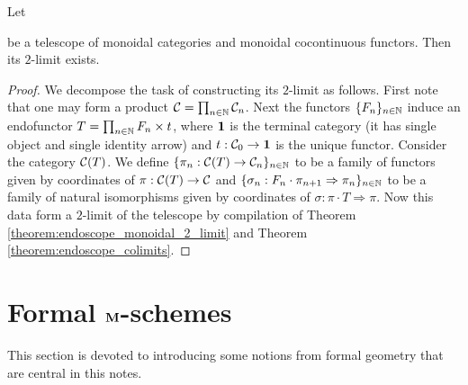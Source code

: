 \begin{corollary}\label{corollary:telescope_2_limits}
Let 
\begin{center}   
\end{center}
be a telescope of monoidal categories and monoidal cocontinuous functors. Then its $2$-limit exists.
\end{corollary}
\begin{proof}
We decompose the task of constructing its $2$-limit as follows. First note that one may form a product ${\mathcal C} = \prod_{n\in {\mathbb N}}{\mathcal C}_n$. Next the functors $\{F_n\}_{n\in {\mathbb N}}$ induce an endofunctor $T = \prod_{n\in {\mathbb N}}F_n\times t$, where $\mathbf{1}$ is the terminal category (it has single object and single identity arrow) and $t:{\mathcal C}_0\rightarrow \mathbf{1}$ is the unique functor. Consider the category ${\mathcal C}(T)$. We define $\{\pi_n:{\mathcal C}(T)\rightarrow {\mathcal C}_n\}_{n\in {\mathbb N}}$ to be a family of functors given by coordinates of $\pi:{\mathcal C}(T)\rightarrow {\mathcal C}$ and $\{\sigma_n:F_n\cdot \pi_{n+1}\Rightarrow \pi_n\}_{n\in {\mathbb N}}$ to be a family of natural isomorphisms given by coordinates of $\sigma:\pi\cdot T\Rightarrow \pi$. Now this data form a $2$-limit of the telescope by compilation of Theorem \ref{theorem:endoscope_monoidal_2_limit} and Theorem \ref{theorem:endoscope_colimits}.
\end{proof}



\section{Formal $\mathbf{M}$-schemes}
\noindent
This section is devoted to introducing some notions from formal geometry that are central in this notes. 

